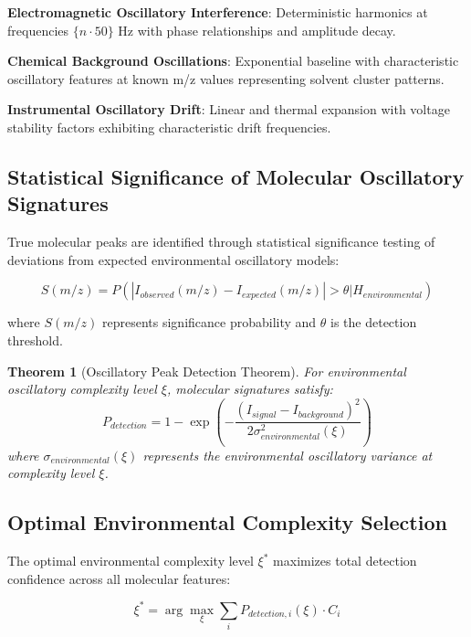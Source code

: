 \documentclass[11pt,a4paper]{article}
\newtheorem{theorem}{Theorem}
\begin{document}
\textbf{Electromagnetic Oscillatory Interference}: Deterministic harmonics at frequencies $\{n \cdot 50\}$ Hz with phase relationships and amplitude decay.

\textbf{Chemical Background Oscillations}: Exponential baseline with characteristic oscillatory features at known m/z values representing solvent cluster patterns.

\textbf{Instrumental Oscillatory Drift}: Linear and thermal expansion with voltage stability factors exhibiting characteristic drift frequencies.

\subsection{Statistical Significance of Molecular Oscillatory Signatures}

True molecular peaks are identified through statistical significance testing of deviations from expected environmental oscillatory models:

\begin{equation}
S(m/z) = P(|I_{observed}(m/z) - I_{expected}(m/z)| > \theta | H_{environmental})
\end{equation}

where $S(m/z)$ represents significance probability and $\theta$ is the detection threshold.

\begin{theorem}[Oscillatory Peak Detection Theorem]
For environmental oscillatory complexity level $\xi$, molecular signatures satisfy:
\begin{equation}
P_{detection} = 1 - \exp\left(-\frac{(I_{signal} - I_{background})^2}{2\sigma_{environmental}^2(\xi)}\right)
\end{equation}
where $\sigma_{environmental}(\xi)$ represents the environmental oscillatory variance at complexity level $\xi$.
\end{theorem}

\subsection{Optimal Environmental Complexity Selection}

The optimal environmental complexity level $\xi^*$ maximizes total detection confidence across all molecular features:

\begin{equation}
\xi^* = \arg\max_\xi \sum_i P_{detection,i}(\xi) \cdot C_i
\end{equation}
\end{document}
